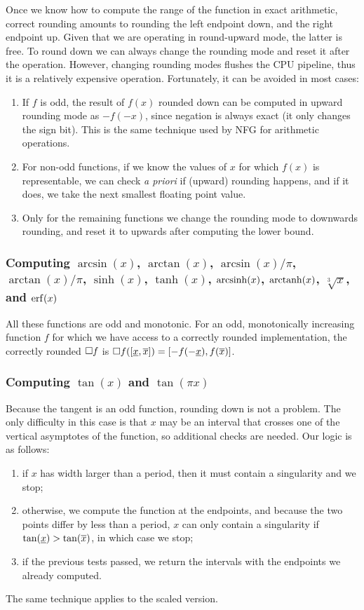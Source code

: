 Once we know how to compute the range of the function in exact arithmetic, correct rounding amounts to rounding the left endpoint down, and the right endpoint up. Given that we are operating in round-upward mode, the latter is free.
To round down we can always change the rounding mode and reset it after the operation. However, changing rounding modes flushes the CPU pipeline, thus it is a relatively expensive operation.
Fortunately, it can be avoided in most cases:
\begin{enumerate}
	\item If $f$ is odd, the result of $f(x)$ rounded down can be computed in upward rounding mode as $-f(-x)$, since negation is always exact (it only changes the sign bit). This is the same technique used by NFG for arithmetic operations.
	\item For non-odd functions, if we know the values of $x$ for which $f(x)$ is representable, we can check \emph{a priori} if (upward) rounding happens, and if it does, we take the next smallest floating point value.
	\item Only for the remaining functions we change the rounding mode to downwards rounding, and reset it to upwards after computing the lower bound.
\end{enumerate}

\subsubsection{Computing $\arcsin(x)$, $\arctan(x)$, $\arcsin(x)/\pi$, $\arctan(x)/\pi$, $\sinh(x)$, $\tanh(x)$, $\operatorname{arcsinh}(x)$, $\operatorname{arctanh}(x)$, $\sqrt[3]{x}$, and $\operatorname{erf}(x)$}
All these functions are odd and monotonic.
For an odd, monotonically increasing function $f$ for which we have access to a correctly rounded implementation, the correctly rounded $\Box f$ is $\Box f([\underline{x}, \overline{x}]) = [-f(-\underline{x}), f(\overline{x})]$.

\subsubsection{Computing $\tan(x)$ and $\tan(\pi x)$}
Because the tangent is an odd function, rounding down is not a problem.
The only difficulty in this case is that $x$ may be an interval that crosses one of the vertical asymptotes of the function, so additional checks are needed.
Our logic is as follows:
\begin{enumerate}
	\item if $x$ has width larger than a period, then it must contain a singularity and we stop;
	\item otherwise, we compute the function at the endpoints, and because the two points differ by less than a period, $x$ can only contain a singularity if $\tan(\underline{x}) > \tan(\overline{x})$, in which case we stop;
	\item if the previous tests passed, we return the intervals with the endpoints we already computed.
\end{enumerate}
The same technique applies to the scaled version.

